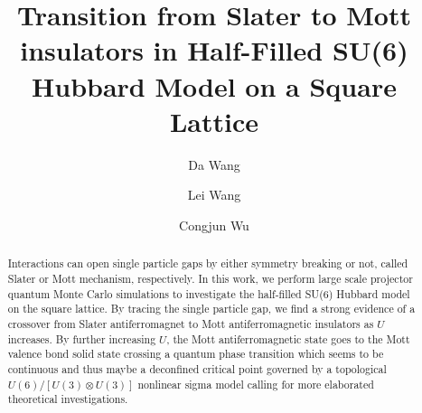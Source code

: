 \documentclass[twocolumn,superscriptaddress,prb]{revtex4-1}
\begin{document}
\title{Transition from Slater to Mott insulators in Half-Filled SU(6) Hubbard Model on a Square Lattice}
\author{Da Wang} %
\author{Lei Wang} %
\author{Congjun Wu} %
\begin{abstract}
    Interactions can open single particle gaps by either symmetry breaking or not, called Slater or Mott mechanism, respectively. In this work, we perform large scale projector quantum Monte Carlo simulations to investigate the half-filled SU(6) Hubbard model on the square lattice. By tracing the single particle gap, we find a strong evidence of a crossover from Slater antiferromagnet to Mott antiferromagnetic insulators as $U$ increases. By further increasing $U$, the Mott antiferromagnetic state goes to the Mott valence bond solid state crossing a quantum phase transition which seems to be continuous and thus maybe a deconfined critical point governed by a topological $U(6)/[U(3)\otimes U(3)]$ nonlinear sigma model calling for more elaborated theoretical investigations. 
\end{abstract}
\maketitle
\end{document}
